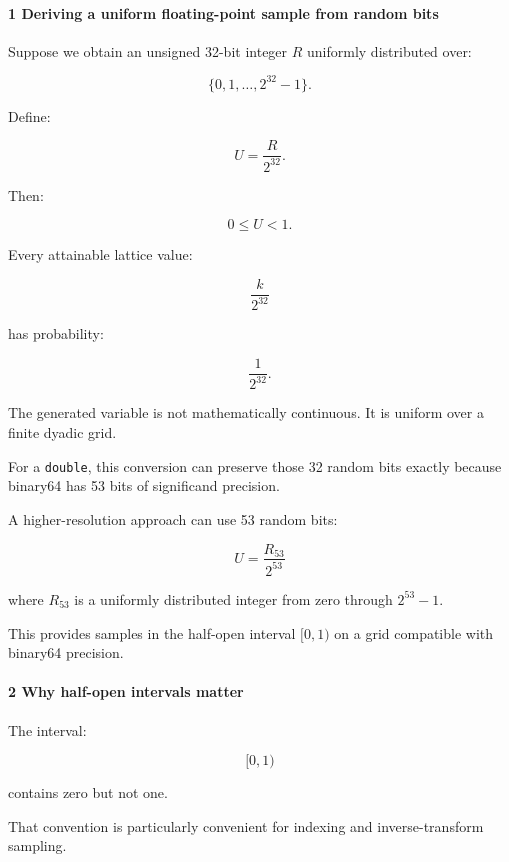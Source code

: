 \paragraph{1 Deriving a uniform floating-point sample from random bits}\label{02-foundations-ii-ch029-deriving-a-uniform-floating-point-sample-from-random-bits}

\hypertarget{02-foundations-ii-ch029-deriving-a-uniform-floating-point-sample-from-random-bits}{}

Suppose we obtain an unsigned 32-bit integer \(R\) uniformly distributed over:

\[
 \{0,1,\ldots,2^{32}-1\}.
\]

Define:

\[
 \boxed{U=\frac{R}{2^{32}}}.
\]

Then:

\[
 0\le U<1.
\]

Every attainable lattice value:

\[
 \frac{k}{2^{32}}
\]

has probability:

\[
 \frac1{2^{32}}.
\]

The generated variable is not mathematically continuous. It is uniform over a finite dyadic grid.

For a \texttt{double}, this conversion can preserve those 32 random bits exactly because binary64 has 53 bits of significand precision.

A higher-resolution approach can use 53 random bits:

\[
 \boxed{ U=\frac{R_{53}}{2^{53}} }
\]

where \(R_{53}\) is a uniformly distributed integer from zero through \(2^{53}-1\).

This provides samples in the half-open interval \([0,1)\) on a grid compatible with binary64 precision.

\paragraph{2 Why half-open intervals matter}\label{02-foundations-ii-ch029-why-half-open-intervals-matter}

\hypertarget{02-foundations-ii-ch029-why-half-open-intervals-matter}{}

The interval:

\[
 [0,1)
\]

contains zero but not one.

That convention is particularly convenient for indexing and inverse-transform sampling.

